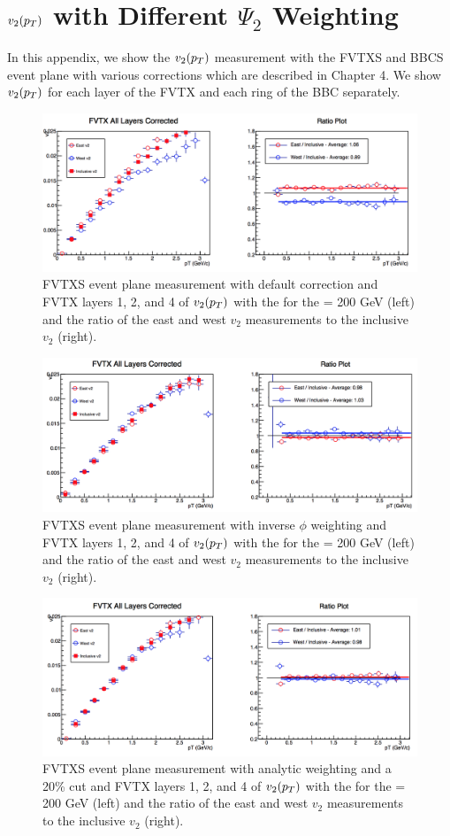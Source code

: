 \chapter{$v_2(\mbox{$p_T$})$ with Different $\Psi_2$ Weighting}	%
\label{sec:appendix}
In this appendix, we show the $v_2(\mbox{$p_T$})$ measurement with the FVTXS and BBCS event plane with various corrections which are described in Chapter 4. We show $v_2(\mbox{$p_T$})$ for each layer of the FVTX and each ring of the BBC separately. 

\begin{figure}
\centering
\includegraphics[width=0.65\linewidth]{figs/fvtx_all_default.png}
\caption{FVTXS event plane measurement with default correction and FVTX layers 1, 2, and 4 of $v_{2}(\mbox{$p_T$})$ with the  for the \pau \sqsn = 200 GeV (left) and the ratio of the east and west $v_2$ measurements to the inclusive $v_2$ (right).}
\end{figure}

\begin{figure}
\centering
\includegraphics[width=0.65\linewidth]{figs/fvtx_all_data.png}
\caption{FVTXS event plane measurement with inverse $\phi$ weighting and FVTX layers 1, 2, and 4 of $v_{2}(\mbox{$p_T$})$ with the  for the \pau \sqsn = 200 GeV (left) and the ratio of the east and west $v_2$ measurements to the inclusive $v_2$ (right).}
\end{figure}

\begin{figure}
\centering
\includegraphics[width=0.65\linewidth]{figs/fvtx_all_analytic.png}
\caption{FVTXS event plane measurement with analytic weighting and a 20\% cut and FVTX layers 1, 2, and 4 of $v_{2}(\mbox{$p_T$})$ with the  for the \pau \sqsn = 200 GeV (left) and the ratio of the east and west $v_2$ measurements to the inclusive $v_2$ (right).}
\end{figure}

